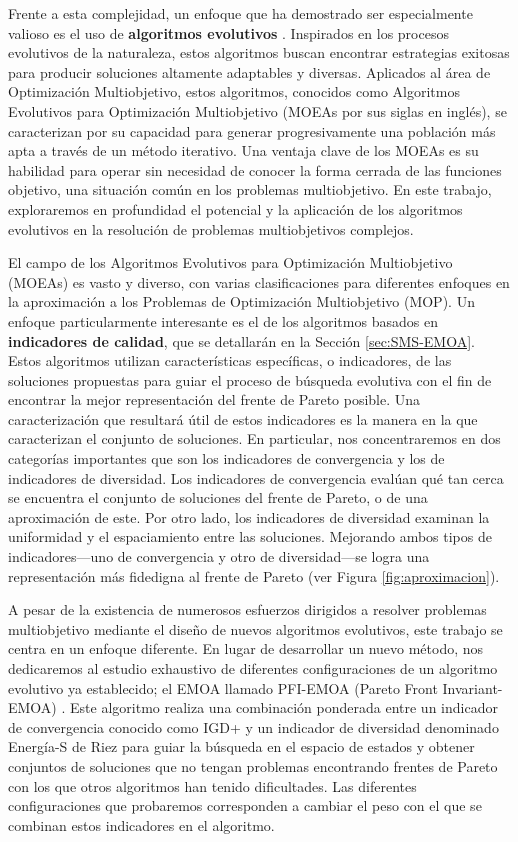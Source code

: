 Frente a esta complejidad, un enfoque que ha demostrado ser especialmente valioso es el uso de \textbf{algoritmos evolutivos} \cite{coelloEvolutionaryAlgorithmsSolving}. Inspirados en los procesos evolutivos de la naturaleza, estos algoritmos buscan encontrar estrategias exitosas para producir soluciones altamente adaptables y diversas. Aplicados al área de Optimización Multiobjetivo, estos algoritmos, conocidos como Algoritmos Evolutivos para Optimización Multiobjetivo (MOEAs por sus siglas en inglés), se caracterizan por su capacidad para generar progresivamente una población más apta a través de un método iterativo. Una ventaja clave de los MOEAs es su habilidad para operar sin necesidad de conocer la forma cerrada de las funciones objetivo, una situación común en los problemas multiobjetivo. En este trabajo, exploraremos en profundidad el potencial y la aplicación de los algoritmos evolutivos en la resolución de problemas multiobjetivos complejos.

El campo de los Algoritmos Evolutivos para Optimización Multiobjetivo (MOEAs) es vasto y diverso, con varias clasificaciones para diferentes enfoques en la aproximación a los Problemas de Optimización Multiobjetivo (MOP). Un enfoque particularmente interesante es el de los algoritmos basados en \textbf{indicadores de calidad}, que se detallarán en la Sección \ref{sec:SMS-EMOA}. Estos algoritmos utilizan características específicas, o indicadores, de las soluciones propuestas para guiar el proceso de búsqueda evolutiva con el fin de encontrar la mejor representación del frente de Pareto posible. Una caracterización que resultará útil de estos indicadores es la manera en la que caracterizan el conjunto de soluciones. En particular, nos concentraremos en dos categorías importantes que son los indicadores de convergencia y los de indicadores de diversidad. Los indicadores de convergencia evalúan qué tan cerca se encuentra el conjunto de soluciones del frente de Pareto, o de una aproximación de este. Por otro lado, los indicadores de diversidad examinan la uniformidad y el espaciamiento entre las soluciones. Mejorando ambos tipos de indicadores—uno de convergencia y otro de diversidad—se logra una representación más fidedigna al frente de Pareto (ver Figura \ref{fig:aproximacion}).

A pesar de la existencia de numerosos esfuerzos dirigidos a resolver problemas multiobjetivo mediante el diseño de nuevos algoritmos evolutivos, este trabajo se centra en un enfoque diferente. En lugar de desarrollar un nuevo método, nos dedicaremos al estudio exhaustivo de diferentes configuraciones de un algoritmo evolutivo ya establecido; el EMOA llamado PFI-EMOA (Pareto Front Invariant-EMOA) \cite{PFI}. Este algoritmo realiza una combinación ponderada entre un indicador de convergencia conocido como IGD+ \cite{IGD} y un indicador de diversidad denominado Energía-S de Riez \cite{sEnergy} para guiar la búsqueda en el espacio de estados y obtener conjuntos de soluciones que no tengan problemas encontrando frentes de Pareto con los que otros algoritmos han tenido dificultades. Las diferentes configuraciones que probaremos corresponden a cambiar el peso con el que se combinan estos indicadores en el algoritmo. 
    
